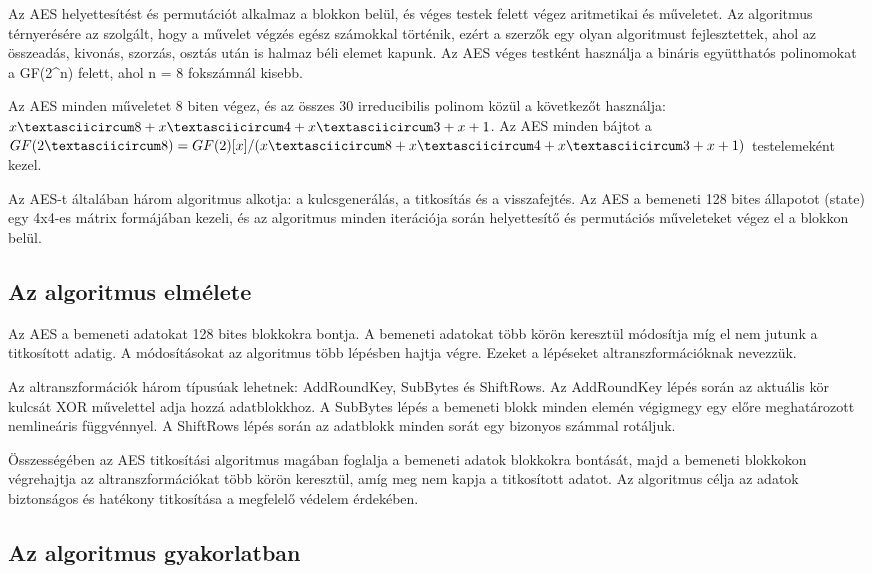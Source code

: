 Az AES helyettesítést és permutációt alkalmaz a blokkon belül, és véges testek felett végez aritmetikai és műveletet. Az algoritmus térnyerésére az szolgált, hogy a művelet végzés egész számokkal történik, ezért a szerzők egy olyan algoritmust fejlesztettek, ahol az összeadás, kivonás, szorzás, osztás után is halmaz béli elemet kapunk. Az AES véges testként használja a bináris együtthatós polinomokat a GF(2\textasciicircum n) felett, ahol n = 8 fokszámnál kisebb.

Az AES minden műveletet 8 biten végez, és az összes 30 irreducibilis polinom közül a következőt használja: $x\textasciicircum 8 + x\textasciicircum 4 + x\textasciicircum 3 + x + 1$. Az AES minden bájtot a $GF(2\textasciicircum 8) = GF(2)[x]/(x\textasciicircum 8 + x\textasciicircum 4 + x\textasciicircum 3 + x + 1)$ testelemeként kezel.

Az AES-t általában három algoritmus alkotja: a kulcsgenerálás, a titkosítás és a visszafejtés. Az AES a bemeneti 128 bites állapotot (state) egy 4x4-es mátrix formájában kezeli, és az algoritmus minden iterációja során helyettesítő és permutációs műveleteket végez el a blokkon belül.

\subsection {Az algoritmus elmélete}

Az AES a bemeneti adatokat 128 bites blokkokra bontja. A bemeneti adatokat több körön keresztül módosítja míg el nem jutunk a titkosított adatig. A módosításokat az algoritmus több lépésben hajtja végre. Ezeket a lépéseket altranszformációknak nevezzük.

Az altranszformációk három típusúak lehetnek: AddRoundKey, SubBytes és ShiftRows. Az AddRoundKey lépés során az aktuális kör kulcsát XOR művelettel adja hozzá adatblokkhoz. A SubBytes lépés a bemeneti blokk minden elemén végigmegy egy előre meghatározott nemlineáris függvénnyel. A ShiftRows lépés során az adatblokk minden sorát egy bizonyos számmal rotáljuk.

Összességében az AES titkosítási algoritmus magában foglalja a bemeneti adatok blokkokra bontását, majd a bemeneti blokkokon végrehajtja az altranszformációkat több körön keresztül, amíg meg nem kapja a titkosított adatot. Az algoritmus célja az adatok biztonságos és hatékony titkosítása a megfelelő védelem érdekében.

\subsection {Az algoritmus gyakorlatban}

